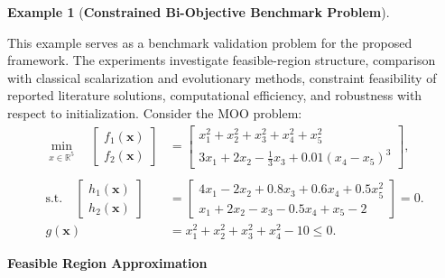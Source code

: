 \documentclass[11pt,pdflatex,sn-mathphys-ay]{sn-jnl}%
\theoremstyle{definition}
\theoremstyle{thmstyleone}%
\theoremstyle{thmstyletwo}%
\newtheorem{example}{Example}%
\theoremstyle{thmstylethree}%
\begin{document}
	\begin{example}[\textbf{Constrained Bi-Objective Benchmark Problem}] 
		\label{EX2}
		
		This example serves as a benchmark validation problem for the proposed framework. The experiments investigate feasible-region structure, comparison with classical scalarization and evolutionary methods, constraint feasibility of reported literature solutions, computational efficiency, and robustness with respect to initialization.
		Consider the MOO problem:
		\[
		\begin{aligned}
			\min_{x \in \mathbb{R}^5} \quad 
			\begin{bmatrix}
				f_1(\bm{x}) \\
				f_2(\bm{x})
			\end{bmatrix}  
			&=
			\begin{bmatrix}
				x_1^2 + x_2^2 + x_3^2 + x_4^2 + x_5^2 \\
				3x_1 + 2x_2 - \tfrac{1}{3}x_3 + 0.01(x_4 - x_5)^3
			\end{bmatrix}, \\\\
			\text{s.t.} \quad
			\begin{bmatrix}
				h_1(\bm{x}) \\
				h_2(\bm{x})
			\end{bmatrix}  &= 
			\begin{bmatrix}
				4x_1 - 2x_2 + 0.8x_3 + 0.6x_4 + 0.5x_5^2 \\
				x_1 + 2x_2 - x_3 - 0.5x_4 + x_5 - 2
			\end{bmatrix}
			= 0.\\
			g(\bm{x}) &= x_1^2 + x_2^2 + x_3^2 + x_4^2 - 10 \leq 0.
		\end{aligned}
		\]
	\end{example}
	
	\medskip
	\noindent \textbf{Feasible Region Approximation}
	
	
	
\end{document}
